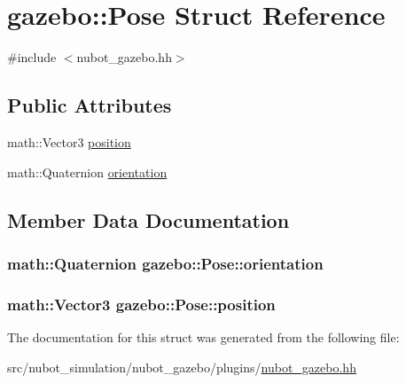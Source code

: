 \hypertarget{structgazebo_1_1Pose}{\section{gazebo\-:\-:Pose Struct Reference}
\label{structgazebo_1_1Pose}
}


{\ttfamily \#include $<$nubot\-\_\-gazebo.\-hh$>$}

\subsection*{Public Attributes}
\begin{DoxyCompactItemize}
\item 
math\-::\-Vector3 \hyperlink{structgazebo_1_1Pose_adf6e7e054dc466c6cd74592b743a7a76}{position}
\item 
math\-::\-Quaternion \hyperlink{structgazebo_1_1Pose_a561aa831b8b83248778e9a977fa92d74}{orientation}
\end{DoxyCompactItemize}


\subsection{Member Data Documentation}
\hypertarget{structgazebo_1_1Pose_a561aa831b8b83248778e9a977fa92d74}{
\subsubsection[{orientation}]{\setlength{\rightskip}{0pt plus 5cm}math\-::\-Quaternion gazebo\-::\-Pose\-::orientation}}\label{structgazebo_1_1Pose_a561aa831b8b83248778e9a977fa92d74}
\hypertarget{structgazebo_1_1Pose_adf6e7e054dc466c6cd74592b743a7a76}{
\subsubsection[{position}]{\setlength{\rightskip}{0pt plus 5cm}math\-::\-Vector3 gazebo\-::\-Pose\-::position}}\label{structgazebo_1_1Pose_adf6e7e054dc466c6cd74592b743a7a76}


The documentation for this struct was generated from the following file\-:\begin{DoxyCompactItemize}
\item 
src/nubot\-\_\-simulation/nubot\-\_\-gazebo/plugins/\hyperlink{nubot__gazebo_8hh}{nubot\-\_\-gazebo.\-hh}\end{DoxyCompactItemize}
